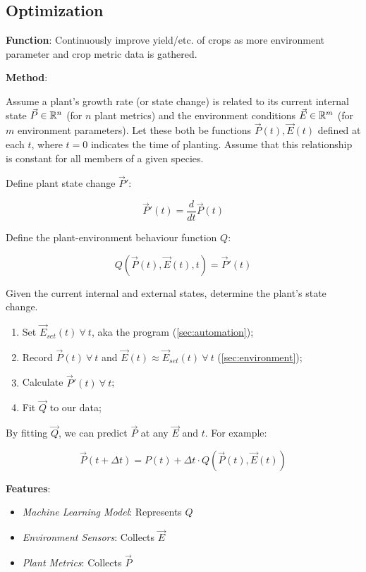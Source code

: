 \documentclass{report}
\begin{document}
\newpage

\subsection{Optimization}
\label{sec:optimization}

\textbf{Function}: Continuously improve yield/etc. of crops as more environment parameter and crop metric data is gathered.

\textbf{Method}: 

Assume a plant's growth rate (or state change) is related to its current internal state $\vec P \in \mathbb R^n$ (for $n$ plant metrics) and the environment conditions $\vec E \in \mathbb R^m$ (for $m$ environment parameters). Let these both be functions $\vec P (t),\vec E(t)$ defined at each $t$, where $t=0$ indicates the time of planting. Assume that this relationship is constant for all members of a given species.

Define plant state change $\vec P'$: 

$$\vec P'(t) = \frac{d}{dt}\vec P(t)$$

Define the plant-environment behaviour function $Q$: 

$$Q(\vec P(t), \vec E(t), t)=\vec P'(t)$$ 

Given the current internal and external states, determine the plant's state change.

\begin{enumerate}
    \item Set $\vec E_{set}(t)~\forall~ t$, aka the program (\ref{sec:automation});
    \item Record $\vec P(t)~\forall~ t$ and $\vec E(t)\approx \vec E_{set}(t)~\forall~ t$ (\ref{sec:environment});
    \item Calculate $\vec P'(t)~\forall~ t$;
    \item Fit $\vec Q$ to our data;
\end{enumerate}

By fitting $\vec Q$, we can predict $\vec P$ at any $\vec E$ and $t$. For example:

$$\vec P(t+\Delta t)=P(t)+\Delta t\cdot Q(\vec P(t),\vec E(t))$$

\textbf{Features}:
\begin{itemize}
    \item \textit{Machine Learning Model}: Represents $Q$
    \item \textit{Environment Sensors}: Collects $\vec E$
    \item \textit{Plant Metrics}: Collects $\vec P$
\end{itemize}
\end{document}
